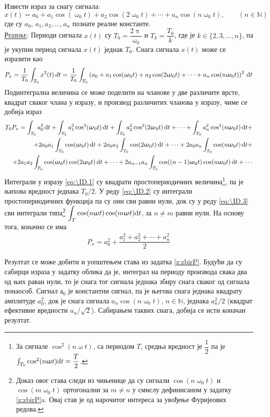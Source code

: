 \noindent 
\PID
Извести израз за снагу сигнала: 
$$
x(t) = a_0 + a_1\cos(\upomega_0 t) +
a_2 \cos(2\upomega_0 t) + \cdots 
+ a_n \cos(n\upomega_0 t), \qquad (n\in\mathbb N)
$$
где су $a_0$, $a_1, a_2, \ldots, a_n$ познате реалне
константе.
\\[2mm]

\textsc{\underline{Решење}}:
Периоди сигнала $x(t)$ су $T_0 = \dfrac{2\uppi}{\upomega_0}$ и $T_k = \dfrac{T_0}{k}$, где је $k \in \{2,3,\ldots,n\}$, 
па је укупни период сигнала $x(t)$ једнак $T_0$. Снага сигнала $x(t)$ може се изразити као 
\begin{equation}
P_x = \dfrac{1}{T_0}\int_{T_0} x^2(t) \, dt =  \dfrac{1}{T_0} \int_{T_0} \left( a_0 + a_1\cos(\upomega_0 t) +
a_2 \cos(2\upomega_0 t) + \cdots
+ a_n \cos(n\upomega_0 t) \right)^2 \, {\rm d} t \\
\end{equation}
Подинтегрална величина се може поделити на чланове у две различите врсте, квадрат сваког члана у изразу, и производ различитих
чланова у изразу, чиме се добија израз
\begin{eqnarray}
T_0 P_x = \int_{T_0} a_0^2 \, \de t + \int_{T_0} a_1^2\cos^2(\upomega_0 t) \, \de t   \label{eq:\ID.1}
+ \int_{T_0} a_2^2 \cos^2(2\upomega_0 t) \, \de t + \cdots + \int_{T_0} a_n^2 \cos^2(n\upomega_0 t) \, \de t + \\
+ 2a_0a_1\int_{T_0} \cos(\upomega_0 t) \, \de t + 
2a_0a_2\int_{T_0} \cos(2\upomega_0 t) \, \de t + \cdots + \label{eq:\ID.2}
2a_0a_n\int_{T_0} \cos(n\upomega_0 t) \, \de t + \\
+ 2a_1a_2\int_{T_0} \cos(\upomega_0 t)\cos(2\upomega_0 t) \, \de t + \cdots + 
2a_{n-1}a_n\int_{T_0} \cos((n-1)\upomega_0 t)\cos(n\upomega_0 t) \, \de t + \cdots   \label{eq:\ID.3}
\end{eqnarray}
Интеграли у изразу \eqref{eq:\ID.1} су квадрати простопериодичних величина\footnote{
За сигнале $\cos^2(n\upomega t)$, са периодом $T$, средња вредност је $\dfrac{1}{2}$ па је 
$\int_{T_0} \cos^2(n\upomega t) {\rm d} t = \dfrac{T}{2}$.
}, па је њихова вредност једнака $T_0/2$. У реду \eqref{eq:\ID.2} су интеграли 
простопериодичних функција па су они сви равни нули, док су у реду \eqref{eq:\ID.3} сви интеграли 
типа\footnote{
    Доказ овог става следи из чињенице да су сигнали $\cos(n \upomega_0 t)$ и $\cos(m \upomega_0 t)$
    ортогонални за $m \neq n$ у смислу дефинисаном у задатку \ref{z:zbirP}a. Овај став је од 
    нарочитог интереса за увођење Фуријеових редова.
}
$\displaystyle\int_T \cos(n\upomega t) \cos(m\upomega t) {\rm d} t$, за $n \neq m$ равни нули. На основу тога, 
коначно се има
\begin{eqnarray}
    P_x = a_0^2 + \dfrac{ a_1^2 + a_2^2 + \cdots + a_n^2 }{2}
\end{eqnarray}

Резултат се може добити и уопштењем става из задатка \ref{z:zbirP}. Будући да су сабирци израза у задатку облика 
да је, интеграл на периоду производа свака два од њих раван нули, то је снага тог сигнала једнака збиру снага сваког 
од сигнала понаособ. Сигнал $а_0$ је константни сигнал, па је његова снага једнака квадрату амплитуде 
$a_0^2$, док је снага сигнала $a_n \cos(n\upomega_0 t)$, $n \in \mathbb N$, једнака $a_n^2/2$ (квадрат ефективне вредности
$a_n/\sqrt 2$). Сабирањем таквих снага, добија се исти коначан резултат.
 